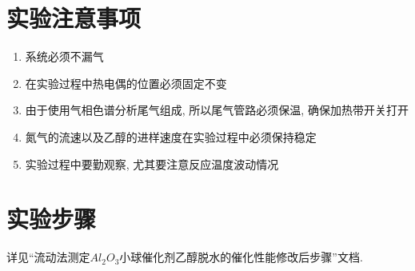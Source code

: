 \documentclass[a4paper]{article}
\begin{document}
\section{实验注意事项}
\begin{enumerate}
\item 系统必须不漏气
\item 在实验过程中热电偶的位置必须固定不变
\item 由于使用气相色谱分析尾气组成, 所以尾气管路必须保温, 
确保加热带开关打开
\item 氮气的流速以及乙醇的进样速度在实验过程中必须保持稳定
\item 实验过程中要勤观察, 尤其要注意反应温度波动情况
\end{enumerate}
\section{实验步骤}
详见``流动法测定$Al_2O_3$小球催化剂乙醇脱水的催化性能修改后步骤''文档.
\end{document}
